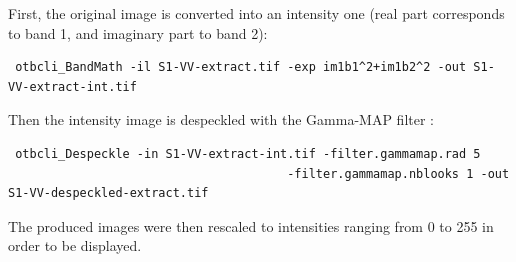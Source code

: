 First, the original image is converted into an intensity one (real part corresponds to band 1, and imaginary part to band 2):

\begin{verbatim} otbcli_BandMath -il S1-VV-extract.tif -exp im1b1^2+im1b2^2 -out S1-VV-extract-int.tif \end{verbatim}

Then the intensity image is despeckled with the Gamma-MAP filter :

\begin{verbatim} otbcli_Despeckle -in S1-VV-extract-int.tif -filter.gammamap.rad 5
									   -filter.gammamap.nblooks 1 -out S1-VV-despeckled-extract.tif \end{verbatim}

The produced images were then rescaled to intensities ranging from 0 to 255 in order to be displayed.


